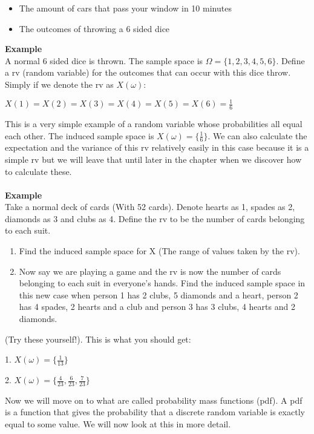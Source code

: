 \documentclass[,oneside]{article}
\begin{document}
\begin{enumerate}
\begin{itemize}
\item The amount of cars that pass your window in 10 minutes 
\item The outcomes of throwing a 6 sided dice \\
\end{itemize}
\textbf{Example}\\
A normal 6 sided dice is thrown. The sample space is $\Omega = \{1,2,3,4,5,6\}$. Define a rv (random variable) for the outcomes that can occur with this dice throw.\\
Simply if we denote the rv as $X(\omega)$:\\
\begin{center}
$X(1)=X(2)=X(3)=X(4)=X(5)=X(6)=\frac{1}{6}$
\end{center}
This is a very simple example of a random variable whose probabilities all equal each other. The induced sample space is $X(\omega)=\{\frac{1}{6}\}$. We can also calculate the expectation and the variance of this rv relatively easily in this case because it is a simple rv but we will leave that until later in the chapter when we discover how to calculate these.\\ \\
\textbf{Example}\\
Take a normal deck of cards (With 52 cards). Denote hearts as 1, spades as 2, diamonds as 3 and clubs as 4. Define the rv to be the number of cards belonging to each suit. \\
\begin{enumerate}
\item Find the induced sample space for X (The range of values taken by the rv).
\item Now say we are playing a game and the rv is now the number of cards belonging to each suit in everyone's hands. Find the induced sample space in this new case when person 1 has 2 clubs, 5 diamonds and a heart, person 2 has 4 spades, 2 hearts and a club and person 3 has 3 clubs, 4 hearts and 2 diamonds.
\end{enumerate}
(Try these yourself!). This is what you should get:\\
\begin{center}
1. $X(\omega) = \{\frac{1}{13}\}$\\
\end{center}
\begin{center}
2. $X(\omega) = \{\frac{4}{23},\frac{6}{23},\frac{7}{23}\}$
\end{center}
Now we will move on to what are called probability mass functions (pdf). A pdf is a function that gives the probability that a discrete random variable is exactly equal to some value. We will now look at this in more detail. \\ \\ \\ \\ \\

\end{enumerate}
\end{document}
